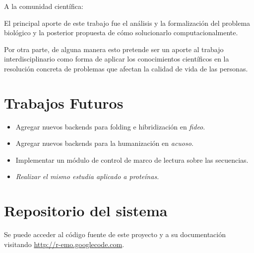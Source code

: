 \par A la comunidad científica:
\par El principal aporte de este trabajo fue el análisis y la formalización del
problema biológico y la posterior propuesta de cómo solucionarlo
computacionalmente. 

\par Por otra parte, de alguna manera esto pretende ser un aporte al trabajo interdisciplinario como forma de aplicar los conocimientos científicos en la resolución concreta de problemas que afectan la calidad de vida de las personas.

\section{Trabajos Futuros}
\begin{itemize}
	\item Agregar nuevos backends para folding e hibridización en \emph{fideo}.	
	\item Agregar nuevos backends para la humanización en \emph{acuoso}.
	\item Implementar un módulo de control de marco de lectura sobre las secuencias.
	\item \emph{Realizar el mismo estudia aplicado a proteínas.}
\end{itemize}

\section{Repositorio del sistema}
Se puede acceder al código fuente de este proyecto y a su documentación visitando \url{http://r-emo.googlecode.com}.


